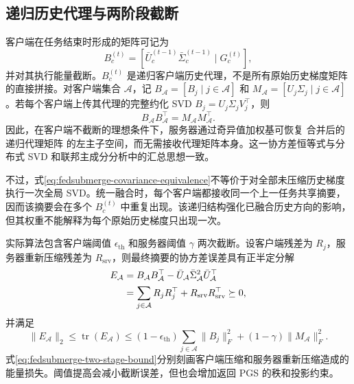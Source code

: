 \subsection{递归历史代理与两阶段截断}
\label{subsec:fedsubmerge-theory-compression}

客户端在任务结束时形成的矩阵可记为
\begin{equation}
B_c^{(t)}
=
\left[
\bar U_c^{(t-1)}\bar\Sigma_c^{(t-1)}
\mid
G_c^{(t)}
\right],
\label{eq:fedsubmerge-recursive-proxy}
\end{equation}
并对其执行能量截断。$B_c^{(t)}$ 是递归客户端历史代理，不是所有原始历史梯度矩阵的直接拼接。对客户端集合 $\mathcal{A}$，记
$B_{\mathcal{A}}=[B_j\mid j\in\mathcal{A}]$ 和
$M_{\mathcal{A}}=[U_j\Sigma_j\mid j\in\mathcal{A}]$。若每个客户端上传其代理的完整约化 SVD
$B_j=U_j\Sigma_jV_j^{\top}$，则
\begin{equation}
B_{\mathcal{A}}B_{\mathcal{A}}^{\top}
=
M_{\mathcal{A}}M_{\mathcal{A}}^{\top}.
\label{eq:fedsubmerge-covariance-equivalence}
\end{equation}
因此，在客户端不截断的理想条件下，服务器通过奇异值加权基可恢复 合并后的递归代理矩阵 的左主子空间，而无需接收代理矩阵本身。这一协方差恒等式与分布式 SVD 和联邦主成分分析中的汇总思想一致\cite{iwen2016distributedSVD,grammenos2020federatedPCA}。

不过，式\eqref{eq:fedsubmerge-covariance-equivalence}不等价于对全部未压缩历史梯度执行一次全局 SVD。统一融合时，每个客户端都接收同一个上一任务共享摘要，因而该摘要会在多个 $B_c^{(t)}$ 中重复出现。该递归结构强化已融合历史方向的影响，但其权重不能解释为每个原始历史梯度只出现一次。

实际算法包含客户端阈值 $\epsilon_{\mathrm{th}}$ 和服务器阈值 $\gamma$ 两次截断。设客户端残差为 $R_j$，服务器重新压缩残差为 $R_{\mathrm{srv}}$，则最终摘要的协方差误差具有正半定分解
\begin{align}
E_{\mathcal{A}}
&=
B_{\mathcal{A}}B_{\mathcal{A}}^{\top}
-
\bar U_{\mathcal{A}}\bar\Sigma_{\mathcal{A}}^2
\bar U_{\mathcal{A}}^{\top}
\notag\\
&=
\sum_{j\in\mathcal{A}}R_jR_j^{\top}
+
R_{\mathrm{srv}}R_{\mathrm{srv}}^{\top}
\succeq0,
\label{eq:fedsubmerge-two-stage-error}
\end{align}
并满足
\begin{equation}
\|E_{\mathcal{A}}\|_2
\leq
\operatorname{tr}(E_{\mathcal{A}})
\leq
(1-\epsilon_{\mathrm{th}})
\sum_{j\in\mathcal{A}}\|B_j\|_F^2
+
(1-\gamma)\|M_{\mathcal{A}}\|_F^2.
\label{eq:fedsubmerge-two-stage-bound}
\end{equation}
式\eqref{eq:fedsubmerge-two-stage-bound}分别刻画客户端压缩和服务器重新压缩造成的能量损失。阈值提高会减小截断误差，但也会增加返回 PGS 的秩和投影约束。

